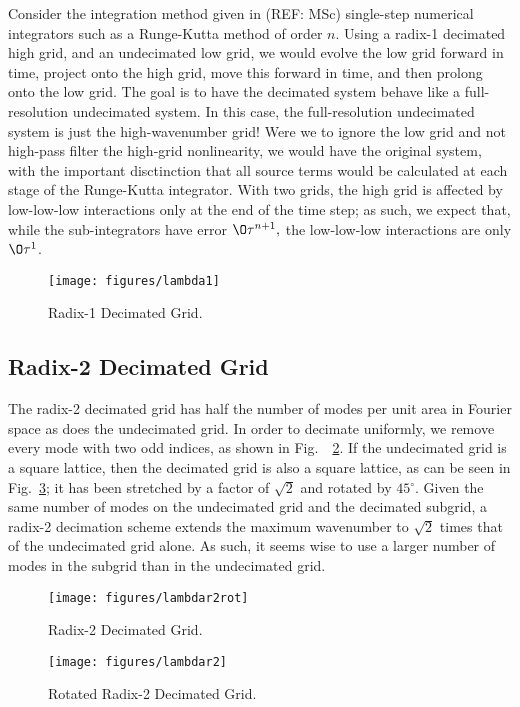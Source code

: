 \documentclass[12pt,showpacs,showkeys,%
amsfonts,amsmath,onecolumn,
floatfix,aps,superscriptaddress]{revtex4}
\begin{document}
Consider the integration method given in (REF: MSc) single-step
numerical integrators such as a Runge-Kutta method of order $n$.
Using a radix-1 decimated high grid, and an undecimated low grid, we
would evolve the low grid forward in time, project onto the high grid,
move this forward in time, and then prolong onto the low grid.  The
goal is to have the decimated system behave like a full-resolution
undecimated system.  In this case, the full-resolution undecimated
system is just the high-wavenumber grid!  Were we to ignore the low
grid and not high-pass filter the high-grid nonlinearity, we would
have the original system, with the important disctinction that all
source terms would be calculated at each stage of the Runge-Kutta
integrator.  With two grids, the high grid is affected by low-low-low
interactions only at the end of the time step; as such, we expect that,
while the sub-integrators have error $\O\tau^{n+1},$ the low-low-low
interactions are only $\O\tau^1$.

\begin{figure}[htbp]
  \begin{center}
    \texttt{[image: figures/lambda1]}
    \caption{Radix-1 Decimated Grid.}
    \label{lambda1}
  \end{center}
\end{figure}


\subsection{Radix-2 Decimated Grid}
The radix-2 decimated grid has half the number of modes per unit area
in Fourier space as does the undecimated grid.  In order to decimate uniformly,
we remove every mode with two odd indices, as shown in Fig.\ ~\ref{lambdar2rot}.
If the undecimated grid is a square lattice, then the decimated grid is also
a square lattice, as can be seen in Fig.\ \ref{lambdar2}; it has been
stretched by a factor of $\sqrt{2}$ and rotated by $45\ensuremath{^\circ}$.
Given the same number of modes on the undecimated grid and the decimated
subgrid, a radix-2 decimation scheme extends the maximum wavenumber to 
$\sqrt{2}$ times that of the undecimated grid alone. As such, it seems wise
to use a larger number of modes in the subgrid than in the undecimated grid.


\begin{figure}[htbp]
  \begin{center}
    \texttt{[image: figures/lambdar2rot]}
    \caption{Radix-2 Decimated Grid.}
    \label{lambdar2rot}
  \end{center}
\end{figure}
\begin{figure}[htbp]
  \begin{center}
    \texttt{[image: figures/lambdar2]}
    \caption{Rotated Radix-2 Decimated Grid.}
    \label{lambdar2}
  \end{center}
\end{figure}
\end{document}
